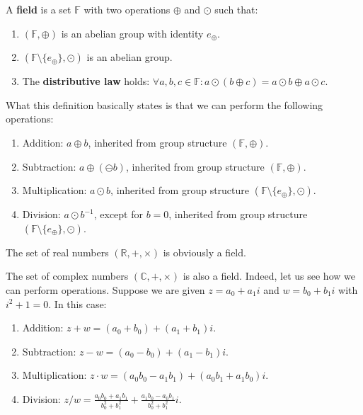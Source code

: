 \documentclass[../lecture-notes.tex]{subfiles}
\begin{document}
\begin{definition}
    A \textbf{field} is a set $\mathbb{F}$ with two operations $\oplus$ and $\odot$ such that:
    \begin{enumerate}
        \item $(\mathbb{F}, \oplus)$ is an abelian group with identity $e_{\oplus}$.
        \item $(\mathbb{F} \setminus \{e_{\oplus}\}, \odot)$ is an abelian group.
        \item The \textbf{distributive law} holds: $\forall a,b,c \in \mathbb{F}: a \odot (b \oplus c) = a \odot b \oplus a \odot c$.
    \end{enumerate}
\end{definition}

What this definition basically states is that we can perform the following operations:
\begin{enumerate}
    \item Addition: $a \oplus b$, inherited from group structure $(\mathbb{F}, \oplus)$.
    \item Subtraction: $a \oplus (\ominus b)$, inherited from group structure $(\mathbb{F}, \oplus)$.
    \item Multiplication: $a \odot b$, inherited from group structure $(\mathbb{F} \setminus \{e_{\oplus}\}, \odot)$.
    \item Division: $a \odot b^{-1}$, except for $b=0$, inherited from group structure $(\mathbb{F} \setminus \{e_{\oplus}\}, \odot)$.
\end{enumerate}

\begin{example}
    The set of real numbers $(\mathbb{R}, +, \times)$ is obviously a field.
\end{example}

\begin{example}
    The set of complex numbers $(\mathbb{C}, +, \times)$ is also a field. Indeed, let us see how we can perform operations. Suppose we are given $z = a_0 + a_1i$ and $w = b_0 + b_1i$ with $i^2+1=0$. In this case:
    \begin{enumerate}
        \item Addition: $z + w = (a_0 + b_0) + (a_1 + b_1)i$.
        \item Subtraction: $z - w = (a_0 - b_0) + (a_1 - b_1)i$.
        \item Multiplication: $z \cdot w = (a_0b_0 - a_1b_1) + (a_0b_1 + a_1b_0)i$.
        \item Division: $z / w = \frac{a_0b_0 + a_1b_1}{b_0^2 + b_1^2} + \frac{a_1b_0 - a_0b_1}{b_0^2 + b_1^2}i$.
    \end{enumerate}
\end{example}
\end{document}
